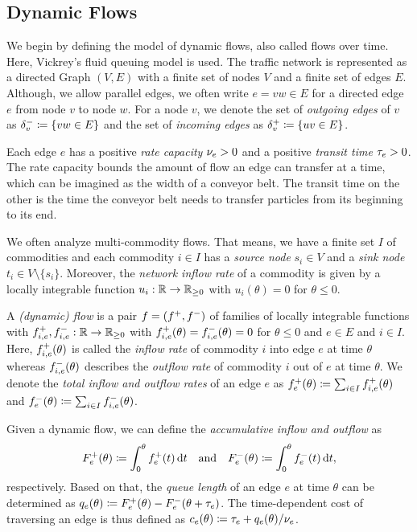 \subsection{Dynamic Flows}\label{subsec:dynamic-flows}

We begin by defining the model of dynamic flows, also called flows over time.
Here, Vickrey's fluid queuing model is used. 
The traffic network is represented as a directed Graph $(V, E)$ with a finite set of nodes $V$ and a finite set of edges $E$.
Although, we allow parallel edges, we often write $e=vw\in E$ for a directed edge $e$ from node $v$ to node $w$.
For a node $v$, we denote the set of \emph{outgoing edges} of $v$ as $\delta^-_{v}\coloneqq \{ vw \in E \}$ and the set of \emph{incoming edges} as $\delta^+_{v} \coloneqq \{ uv \in E \}$.

Each edge $e$ has a positive \emph{rate capacity} $\nu_e > 0$ and a positive \emph{transit time} $\tau_e > 0$.
The rate capacity bounds the amount of flow an edge can transfer at a time, which can be imagined as the width of a conveyor belt.
The transit time on the other is the time the conveyor belt needs to transfer particles from its beginning to its end.

We often analyze multi-commodity flows.
That means, we have a finite set $I$ of commodities and each commodity $i\in I$ has a \emph{source node} $s_i\in V$ and a \emph{sink node} $t_i\in V\setminus\{ s_i \}$.
Moreover, the \emph{network inflow rate} of a commodity is given by a locally integrable function $u_i:\mathbb{R} \rightarrow \mathbb{R}_{\geq 0}$ with $u_i(\theta) = 0$ for $\theta \leq 0$.



\begin{definition}
    A \emph{(dynamic) flow} is a pair $f = ({f}^+, {f}^-)$ of families of locally integrable functions with ${f}^+_{i,e}, {f}^-_{i,e} : \mathbb{R} \rightarrow \mathbb{R}_{\geq 0}$ with ${f}^+_{i,e}(\theta) = {f}^-_{i,e}(\theta) = 0$ for $\theta \leq 0$ and  $e\in E$ and $i\in I$.
    Here, ${f}^+_{i,e}(\theta)$ is called the \emph{inflow rate} of commodity $i$ into edge $e$ at time $\theta$ whereas ${f}^-_{i,e}(\theta)$ describes the \emph{outflow rate} of commodity $i$ out of $e$ at time $\theta$.
    We denote the \emph{total inflow and outflow rates} of an edge $e$ as ${f}^+_e(\theta) \coloneqq \sum_{i\in I} {f}^+_{i,e}(\theta)$ and ${f}^-_e(\theta) \coloneqq \sum_{i\in I}{f}^-_{i,e}(\theta)$.

    Given a dynamic flow, we can define the \emph{accumulative inflow and outflow} as
    \[
        F^+_e(\theta) \coloneqq \int_0^\theta {f}^+_e(t) \,\textnormal{d} t \quad\text{and}\quad  F^-_e(\theta) \coloneqq \int_0^\theta {f}^-_e(t) \,\textnormal{d} t,
    \]
    respectively.
    Based on that, the \emph{queue length} of an edge $e$ at time $\theta$ can be determined as $q_e(\theta) \coloneqq F^+_e(\theta) - F^-_e(\theta + \tau_e)$.
    The time-dependent cost of traversing an edge is thus defined as $c_e(\theta) \coloneqq \tau_e + q_e(\theta) / \nu_e$.
\end{definition}

